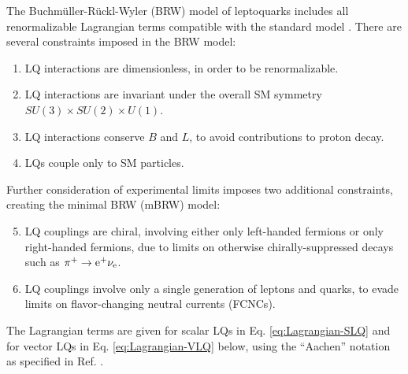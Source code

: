 The Buchm\"{u}ller-R\"{u}ckl-Wyler (BRW) model of leptoquarks includes all renormalizable Lagrangian terms compatible with the standard model \cite{BRW}. There are several constraints imposed in the BRW model:
\begin{enumerate}
\item LQ interactions are dimensionless, in order to be renormalizable.
\item LQ interactions are invariant under the overall SM symmetry $SU(3) \times SU(2) \times U(1)$.
\item LQ interactions conserve $B$ and $L$, to avoid contributions to proton decay.
\item LQs couple only to SM particles.
\end{enumerate}
Further consideration of experimental limits imposes two additional constraints, creating the minimal BRW (mBRW) model:
\begin{enumerate}
\setcounter{enumi}{4}
\item LQ couplings are chiral, involving either only left-handed fermions or only right-handed fermions, due to limits on otherwise chirally-suppressed decays such as $\pi^{+} \rightarrow \mathrm{e}^{+} \nu_{\mathrm{e}}$.
\item LQ couplings involve only a single generation of leptons and quarks, to evade limits on flavor-changing neutral currents (FCNCs).
\end{enumerate}
The Lagrangian terms are given for scalar LQs in Eq. \eqref{eq:Lagrangian-SLQ} and for vector LQs in Eq. \eqref{eq:Lagrangian-VLQ} below, using the ``Aachen'' notation as specified in Ref. \cite{ModelIndLQ}.
